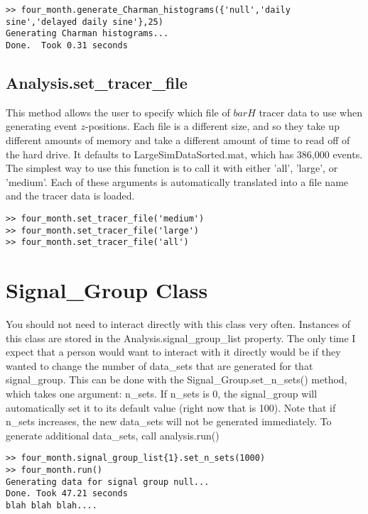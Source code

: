 \documentclass[12pt]{report}
\begin{document}
\begin{verbatim}
>> four_month.generate_Charman_histograms({'null','daily sine','delayed daily sine'},25)
Generating Charman histograms...
Done.  Took 0.31 seconds
\end{verbatim}

\section{Analysis.set\_tracer\_file}
This method allows the user to specify which file of $bar{H}$ tracer data to use when generating event $z$-positions.  Each file is a different size, and so they take up different amounts of memory and take a different amount of time to read off of the hard drive.  It defaults to LargeSimDataSorted.mat, which has 386,000 events.  The simplest way to use this function is to call it with either 'all', 'large', or 'medium'.  Each of these arguments is automatically translated into a file name and the tracer data is loaded.

\begin{verbatim}
>> four_month.set_tracer_file('medium')
>> four_month.set_tracer_file('large')
>> four_month.set_tracer_file('all')
\end{verbatim}





\chapter{Signal\_Group Class}
You should not need to interact directly with this class very often.  Instances of this class are stored in the Analysis.signal\_group\_list property.  The only time I expect that a person would want to interact with it directly would be if they wanted to change the number of data\_sets that are generated for that signal\_group.  This can be done with the Signal\_Group.set\_n\_sets() method, which takes one argument: n\_sets.  If n\_sets is 0, the signal\_group will automatically set it to its default value (right now that is 100).  Note that if n\_sets increases, the new data\_sets will not be generated immediately.  To generate additional data\_sets, call analysis.run()

\begin{verbatim}
>> four_month.signal_group_list{1}.set_n_sets(1000)
>> four_month.run()
Generating data for signal group null...
Done. Took 47.21 seconds
blah blah blah....
\end{verbatim}
\end{document}
